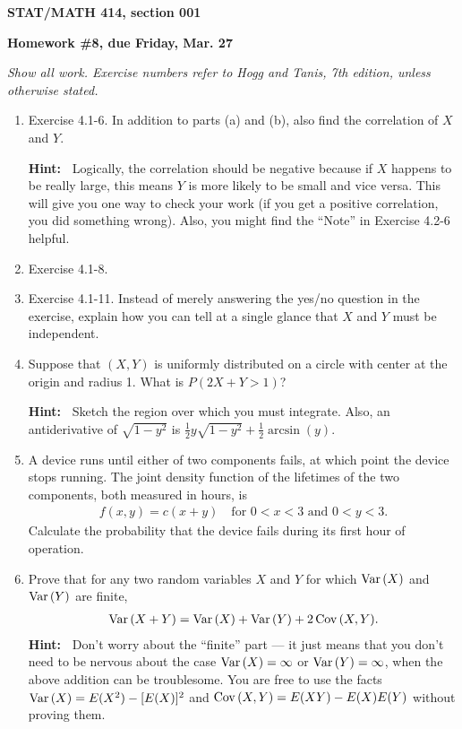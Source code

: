 \documentclass{article}
\def\Var{\mathop{\rm Var\,}\nolimits}
\def\Cov{\mathop{\rm Cov\,}\nolimits}
\newcommand{\beaa}{\begin{eqnarray*}}
\newcommand{\eeaa}{\end{eqnarray*}}
\begin{document}
\begin{center}
{\bf STAT/MATH 414, section 001}

{\bf Homework \#8, due Friday, Mar. 27}
\end{center}

{\em Show all work.  Exercise numbers refer to Hogg and Tanis, 7th edition, unless otherwise stated.}

\begin{enumerate}

\item Exercise 4.1-6.  In addition to parts (a) and (b), also find the correlation of $X$ and $Y$.

{\bf Hint:\ }
Logically, the correlation should be negative because if $X$ happens to be really large, this
means $Y$ is more likely to be small and vice versa.  This will give you one way to check
your work (if you get a positive correlation, you did something wrong).  Also, you might find
the ``Note'' in Exercise 4.2-6 helpful.

\item Exercise 4.1-8.

\item Exercise 4.1-11.   Instead of merely answering the yes/no question in the exercise, explain how you
can tell at a single glance that $X$ and $Y$ must be independent.  


\item Suppose that $(X,Y)$ is uniformly distributed on a circle with center at the origin and
radius 1.  What is $P(2X+Y>1)$?

{\bf Hint:\ } Sketch the region over which you must integrate.  Also, an antiderivative of 
$\sqrt{1-y^2}$ is $\frac12y\sqrt{1-y^2} + \frac12\arcsin(y)$.  

\item
A device runs until either of two components fails, at which point the device stops
running. The joint density function of the lifetimes of the two components, both
measured in hours, is
\beaa
f(x,y) = c(x+y) \quad\mbox{for $0<x<3$ and $0<y<3$.}
\eeaa
Calculate the probability that the device fails during its first hour of operation.


\item Prove that for any two random variables $X$ and $Y$ for which $\Var(X)$ and $\Var(Y)$
are finite,
\beaa
\Var(X+Y) = \Var(X) + \Var(Y) + 2\Cov(X,Y).
\eeaa
{\bf Hint:\ } Don't worry about the ``finite'' part --- it just means that you don't need to be nervous
about the case $\Var(X)=\infty$ or $\Var(Y)=\infty$, when the above addition can be troublesome.
You are free to use the facts $\Var(X)=E(X^2)-[E(X)]^2$ and 
$\Cov(X,Y)=E(XY) - E(X)E(Y)$ without proving them.


\end{enumerate}
\end{document}
